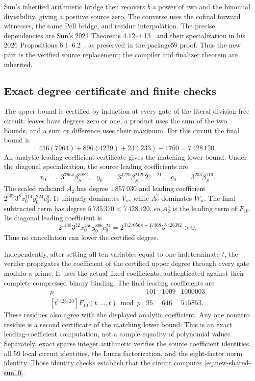 Sun's inherited arithmetic bridge then recovers $b$ a power of two and
the binomial divisibility, giving a positive source zero. The converse
uses the cofinal forward witnesses, the same Pell bridge, and residue
interpolation. The precise dependencies are Sun's 2021 Theorems
4.12--4.13~\cite{sun2021} and their specialization in his 2026
Propositions 6.1--6.2~\cite{sun},
as preserved in the package59 proof. Thus the new part is the verified
source replacement; the compiler and finalizer theorem are inherited.

\subsection{Exact degree certificate and finite checks}

The upper bound is certified by induction at every gate of the literal
division-free circuit: leaves have degrees zero or one, a product uses
the sum of the two bounds, and a sum or difference uses their maximum.
For this circuit the final bound is
\[
 456(7964)+896(4229)+24(233)+1760=7\,428\,120.
\]
An analytic leading-coefficient certificate gives the matching lower
bound. Under the diagonal specialization, the source leading coefficients
are
\begin{align*}
 x_0&=3^{7964}\beta_S^{3982},&
 y_0&=3^{4229}\beta_S^{2129}2^{\kappa-21},&
 c_0&=3^{233}\beta_S^{116}.
\end{align*}
The scaled radicand $A_2$ has degree $1\,857\,030$ and leading coefficient
$2^{362}3^8x_0^{114}y_0^{224}c_0^6$. It uniquely dominates $V_n$, while
$A_2^2$ dominates $W_n$. The final subtracted term has degree
$5\,735\,370<7\,428\,120$, so $A_2^4$ is the leading term of $F_{10}$.
Its diagonal leading coefficient is
\[
 2^{1448}3^{32}x_0^{456}y_0^{896}c_0^{24}
   =2^{3727056\kappa-17368}3^{7426392}>0.
\]
Thus no cancellation can lower the certified degree.

Independently, after setting all ten variables equal to one indeterminate
$t$, the verifier propagates the coefficient of the certified upper degree
through every gate modulo a prime. It uses the actual fixed coefficients,
authenticated against their complete compressed binary binding. The final
leading coefficients are
\[
 \begin{array}{c|ccc}
 p&101&1009&1000003\\\hline
 [t^{7428120}]F_{10}(t,\ldots,t)\bmod p&95&646&515853.
 \end{array}
\]
These residues also agree with the displayed analytic coefficient. Any
one nonzero residue is a second certificate of the matching lower bound.
This is an exact leading-coefficient computation, not a sample equality
of polynomial values. Separately, exact sparse integer arithmetic verifies the source
coefficient identities, all 59 local circuit identities, the Lucas
factorization, and the eight-factor norm identity. Those identity checks
establish that the circuit computes \eqref{eq:new-shared-sun10}.


